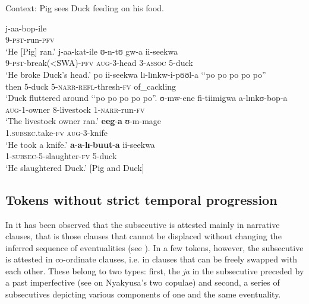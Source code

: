 \pagebreak
\begin{exe}
\ex Context: Pig sees Duck feeding on his food.
\label{exSubsecPigDuckPeakWithSubsec}\begin{xlist}
\ex \label{exSubsecPigDuckPeakWithSubsecSentence1} \gll j-aa-bop-ile\\
9-\textsc{pst}-run-\textsc{pfv}\\
\glt \lq He [Pig] ran.'
\ex \label{exSubsecPigDuckPeakWithSubsecSentence2} \gll j-aa-kat-ile ʊ-n-tʊ gw-a ii-seekwa\\
9-\textsc{pst}-break(<SWA)-\textsc{pfv} \textsc{aug}-3-head 3-\textsc{assoc} 5-duck\\
\glt \lq He broke Duck's head.'
\ex \label{exSubsecPigDuckPeakWithSubsecSentence3} \gll po ii-seekwa lɪ-lɪnkw-i-pʊʊl-a \lq\lq{po po po po po}''\\
then 5-duck 5-\textsc{narr}-\textsc{refl}-thresh-\textsc{fv} \phantom{\lq\lq}of\_cackling\\
\glt \lq Duck fluttered around \lq \lq po po po po po''.
\ex \label{exSubsecPigDuckPeakWithSubsecSentence4} \gll ʊ-mw-ene fi-tiimigwa a-lɪnkʊ-bop-a\\
\textsc{aug}-1-owner 8-livestock 1-\textsc{narr}-run-\textsc{fv}\\
\glt `The livestock owner ran.'
\ex \label{exSubsecPigDuckPeakWithSubsecSentence5}\gll \textbf{eeg}-\textbf{a} ʊ-m-mage\\
1.\textsc{subsec}.take-\textsc{fv} \textsc{aug}-3-knife\\
\glt `He took a knife.'
\ex\label{exSubsecPigDuckPeakWithSubsecSentence6}\gll \textbf{a}-\textbf{a}-\textbf{lɪ}-\textbf{buut}-\textbf{a} ii-seekwa\\
1-\textsc{subsec}-5-slaughter-\textsc{fv} 5-duck \\
\glt `He slaughtered Duck.' [Pig and Duck]
\end{xlist}
\end{exe}

\subsection{Tokens without strict temporal progression}\label{SubsecutiveCounterExamples}
In  it has been observed that the subsecutive is attested mainly in narrative clauses, that is those clauses that cannot be displaced without changing the inferred sequence of eventualities (see ). In a few tokens, however, the subsecutive is attested in co-ordinate clauses, i.e. in clauses that can be freely swapped with each other. These belong to two types: first, the  \textit{ja} in the subsecutive preceded by a past imperfective (see  on Nyakyusa's two copulae) and second, a series of subsecutives depicting various components of one and the same eventuality.

